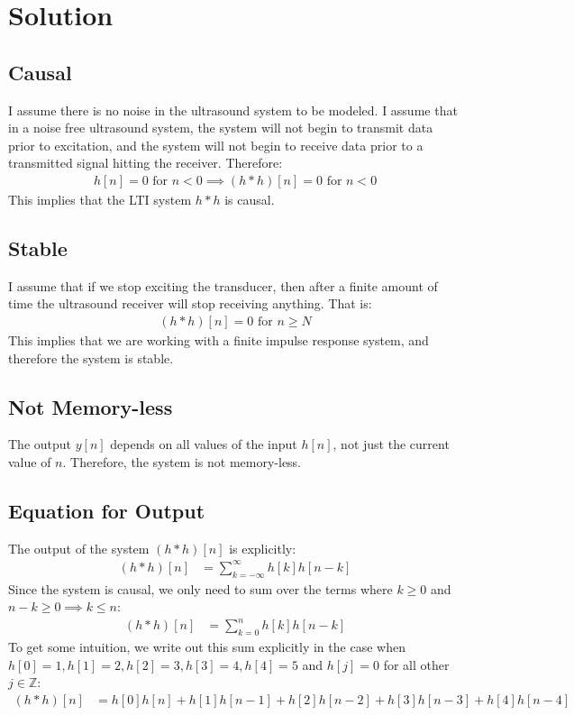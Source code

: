 \documentclass[a4paper]{article}
\begin{document}
\section*{Solution}
\subsection*{Causal}
I assume there is no noise in the ultrasound system to be modeled. I assume that in a noise free ultrasound system, the system will not begin to transmit data prior to excitation, and the system will not begin to receive data prior to a transmitted signal hitting the receiver. Therefore:
\begin{align*}
h[n] = 0 \text{ for } n < 0 \implies (h*h)[n] = 0 \text{ for } n < 0 
\end{align*}
This implies that the LTI system  $h*h$ is causal. 
\subsection*{Stable}
I assume that if we stop exciting the transducer, then after a finite amount of time the ultrasound receiver will stop receiving anything. That is:
\begin{align*}
(h*h)[n] = 0 \text{ for } n \geq N
\end{align*}
This implies that we are working with a finite impulse response system, and therefore the system is stable.
\subsection*{Not Memory-less}
The output $y[n]$ depends on all values of the input $h[n]$, not just the current value of $n$. Therefore, the system is not memory-less.
\subsection*{Equation for Output}
The output of the system $(h*h)[n]$ is explicitly:
\begin{align*}
(h*h)[n] &= \sum_{k=-\infty}^{\infty}h[k]h[n-k]
\end{align*}
Since the system is causal, we only need to sum over the terms where $k \geq 0$ and $n - k \geq 0 \implies k \leq n$:
\begin{align*}
(h*h)[n] &= \sum_{k=0}^{n}h[k]h[n-k]
\end{align*}
To get some intuition, we write out this sum explicitly in the case when $h[0] = 1, h[1] = 2, h[2] = 3, h[3] = 4, h[4] = 5$ and $h[j] = 0$ for all other $j \in \mathbb{Z}$:
\begin{align*}
(h*h)[n] &= h[0]h[n] + h[1]h[n-1] + h[2]h[n-2] + h[3]h[n-3] + h[4]h[n-4]
\end{align*}
\clearpage
\end{document}
